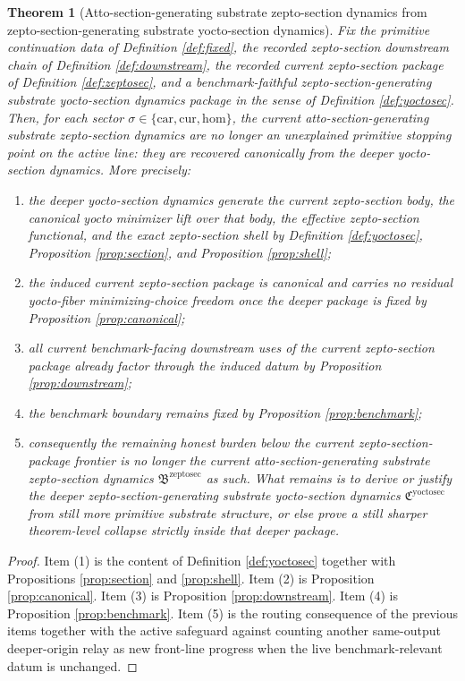 \documentclass[11pt]{article}
\newcommand{\Car}{\mathrm{car}}
\newcommand{\Cur}{\mathrm{cur}}
\newcommand{\Hom}{\mathrm{hom}}
\newcommand{\ZeptoSectionPackage}{\mathfrak B^{\mathrm{zeptosec}}}
\newcommand{\YoctoSectionPackage}{\mathfrak C^{\mathrm{yoctosec}}}
\newtheorem{theorem}{Theorem}
\begin{document}
\begin{theorem}[Atto-section-generating substrate zepto-section dynamics from zepto-section-generating substrate yocto-section dynamics]
\label{thm:main}
Fix the primitive continuation data of Definition \ref{def:fixed}, the recorded zepto-section downstream chain of Definition \ref{def:downstream}, the recorded current zepto-section package of Definition \ref{def:zeptosec}, and a benchmark-faithful zepto-section-generating substrate yocto-section dynamics package in the sense of Definition \ref{def:yoctosec}. Then, for each sector \(\sigma\in\{\Car,\Cur,\Hom\}\), the current atto-section-generating substrate zepto-section dynamics are no longer an unexplained primitive stopping point on the active line: they are recovered canonically from the deeper yocto-section dynamics. More precisely:
\begin{enumerate}
    \item the deeper yocto-section dynamics generate the current zepto-section body, the canonical yocto minimizer lift over that body, the effective zepto-section functional, and the exact zepto-section shell by Definition \ref{def:yoctosec}, Proposition \ref{prop:section}, and Proposition \ref{prop:shell};
    \item the induced current zepto-section package is canonical and carries no residual yocto-fiber minimizing-choice freedom once the deeper package is fixed by Proposition \ref{prop:canonical};
    \item all current benchmark-facing downstream uses of the current zepto-section package already factor through the induced datum by Proposition \ref{prop:downstream};
    \item the benchmark boundary remains fixed by Proposition \ref{prop:benchmark};
    \item consequently the remaining honest burden below the current zepto-section-package frontier is no longer the current atto-section-generating substrate zepto-section dynamics \(\ZeptoSectionPackage\) as such. What remains is to derive or justify the deeper zepto-section-generating substrate yocto-section dynamics \(\YoctoSectionPackage\) from still more primitive substrate structure, or else prove a still sharper theorem-level collapse strictly inside that deeper package.
\end{enumerate}
\end{theorem}

\begin{proof}
Item (1) is the content of Definition \ref{def:yoctosec} together with Propositions \ref{prop:section} and \ref{prop:shell}. Item (2) is Proposition \ref{prop:canonical}. Item (3) is Proposition \ref{prop:downstream}. Item (4) is Proposition \ref{prop:benchmark}. Item (5) is the routing consequence of the previous items together with the active safeguard against counting another same-output deeper-origin relay as new front-line progress when the live benchmark-relevant datum is unchanged.
\end{proof}
\end{document}
